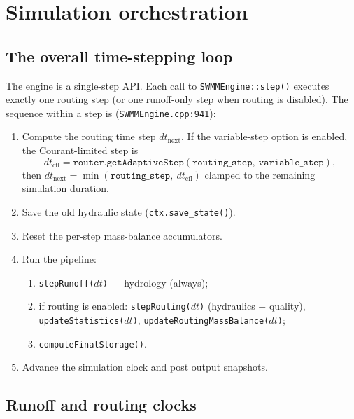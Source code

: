 \documentclass[11pt,a4paper]{article}
\begin{document}
\section{Simulation orchestration}

\subsection{The overall time-stepping loop}

The engine is a single-step API. Each call to \texttt{SWMMEngine::step()}
executes exactly one routing step (or one runoff-only step when routing is
disabled). The sequence within a step is (\texttt{SWMMEngine.cpp:941}):
\begin{enumerate}[nosep]
  \item Compute the routing time step $dt_{\mathrm{next}}$. If the variable-step
        option is enabled, the Courant-limited step is
        \[
          dt_{\mathrm{cfl}} = \texttt{router.getAdaptiveStep}(
            \texttt{routing\_step},\ \texttt{variable\_step}),
        \]
        then $dt_{\mathrm{next}} = \min(\texttt{routing\_step},\ dt_{\mathrm{cfl}})$
        clamped to the remaining simulation duration.
  \item Save the old hydraulic state (\texttt{ctx.save\_state()}).
  \item Reset the per-step mass-balance accumulators.
  \item Run the pipeline:
        \begin{enumerate}[nosep]
          \item \texttt{stepRunoff($dt$)} --- hydrology (always);
          \item if routing is enabled: \texttt{stepRouting($dt$)} (hydraulics +
                quality), \texttt{updateStatistics($dt$)},
                \texttt{updateRoutingMassBalance($dt$)};
          \item \texttt{computeFinalStorage()}.
        \end{enumerate}
  \item Advance the simulation clock and post output snapshots.
\end{enumerate}

\subsection{Runoff and routing clocks}
\end{document}

